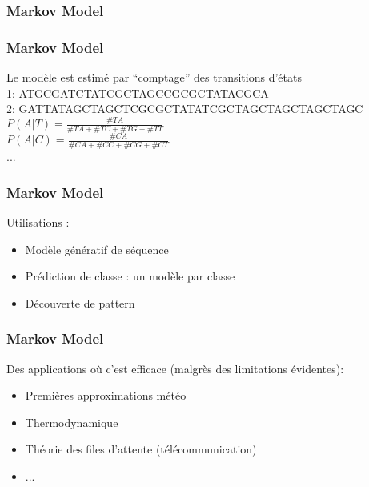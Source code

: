 \begin{frame}
  \frametitle{Markov Model}
\end{frame}

\begin{frame}
  \frametitle{Markov Model}
  Le modèle est estimé par ``comptage'' des transitions d'états \\
  1: ATGCGATCTATCGCTAGCCGCGCTATACGCA \\
  2: GATTATAGCTAGCTCGCGCTATATCGCTAGCTAGCTAGCTAGC \\
  $P(A|T) = \frac{\#TA}{\#TA+\#TC+\#TG+\#TT}$ \\
  $P(A|C) = \frac{\#CA}{\#CA+\#CC+\#CG+\#CT}$ \\
  ...
\end{frame}

\begin{frame}
  \frametitle{Markov Model}
  Utilisations :
  \begin{itemize}
  \item Modèle génératif de séquence
  \item Prédiction de classe : un modèle par classe
  \item Découverte de pattern
  \end{itemize}
\end{frame}

\begin{frame}
  \frametitle{Markov Model}
  Des applications où c'est efficace (malgrès des limitations évidentes):
  \begin{itemize}
  \item Premières approximations météo
  \item Thermodynamique
  \item Théorie des files d'attente (télécommunication)
  \item ...
  \end{itemize}
\end{frame}
